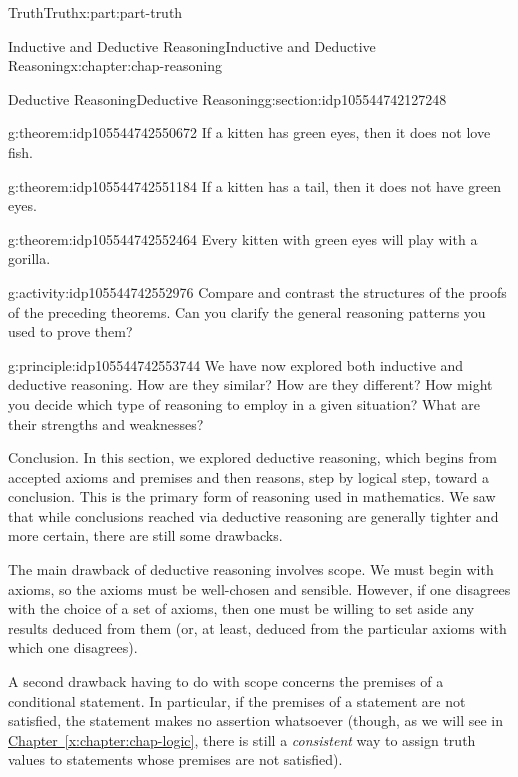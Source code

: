 \documentclass[oneside,10pt,]{book}
\newcommand{\xreffont}{\relax}
\numberwithin{equation}{section}
\begin{document}
\begin{partptx}{Truth}{}{Truth}{}{}{x:part:part-truth}
\begin{chapterptx}{Inductive and Deductive Reasoning}{}{Inductive and Deductive Reasoning}{}{}{x:chapter:chap-reasoning}
\begin{sectionptx}{Deductive Reasoning}{}{Deductive Reasoning}{}{}{g:section:idp105544742127248}
\begin{theorem}{}{}{g:theorem:idp105544742550672}%
If a kitten has green eyes, then it does not love fish.%
\end{theorem}
\begin{theorem}{}{}{g:theorem:idp105544742551184}%
If a kitten has a tail, then it does not have green eyes.%
\end{theorem}
\begin{theorem}{}{}{g:theorem:idp105544742552464}%
Every kitten with green eyes will play with a gorilla.%
\end{theorem}
\begin{activity}{}{g:activity:idp105544742552976}%
Compare and contrast the structures of the proofs of the preceding theorems. Can you clarify the general reasoning patterns you used to prove them?%
\end{activity}%
\begin{principle}{}{}{g:principle:idp105544742553744}%
We have now explored both inductive and deductive reasoning. How are they similar? How are they different? How might you decide which type of reasoning to employ in a given situation? What are their strengths and weaknesses?%
\end{principle}
\begin{conclusion}{Conclusion.}%
In this section, we explored deductive reasoning, which begins from accepted axioms and premises and then reasons, step by logical step, toward a conclusion. This is the primary form of reasoning used in mathematics. We saw that while conclusions reached via deductive reasoning are generally tighter and more certain, there are still some drawbacks.%
\par
The main drawback of deductive reasoning involves scope. We must begin with axioms, so the axioms must be well-chosen and sensible. However, if one disagrees with the choice of a set of axioms, then one must be willing to set aside any results deduced from them (or, at least, deduced from the particular axioms with which one disagrees).%
\par
A second drawback having to do with scope concerns the premises of a conditional statement. In particular, if the premises of a statement are not satisfied, the statement makes no assertion whatsoever (though, as we will see in \hyperref[x:chapter:chap-logic]{Chapter~{\xreffont\ref{x:chapter:chap-logic}}}, there is still a \emph{consistent} way to assign truth values to statements whose premises are not satisfied).%
\end{conclusion}%

\end{sectionptx}
\end{chapterptx}
\end{partptx}
\end{document}
